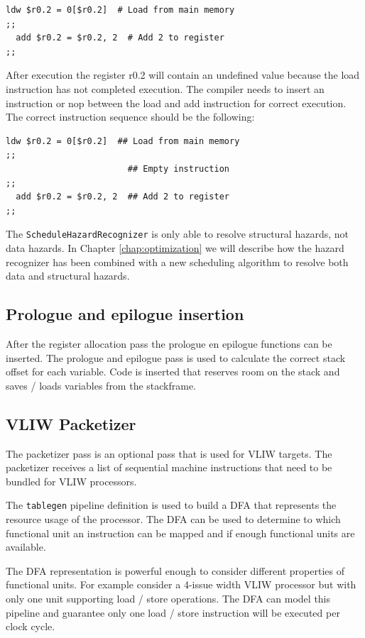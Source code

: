 \begin{lstlisting}[language=rvex]
  ldw $r0.2 = 0[$r0.2]  # Load from main memory
;;
  add $r0.2 = $r0.2, 2  # Add 2 to register
;;
\end{lstlisting}

After execution the register r0.2 will contain an undefined value because the load instruction has not completed execution. The compiler needs to insert an instruction or nop between the load and add instruction for correct execution. The correct instruction sequence should be the following:

\begin{lstlisting}[language=rvex]
  ldw $r0.2 = 0[$r0.2]  ## Load from main memory
;;
                        ## Empty instruction
;;
  add $r0.2 = $r0.2, 2  ## Add 2 to register
;;
\end{lstlisting}

The \texttt{ScheduleHazardRecognizer} is only able to resolve structural hazards, not data hazards. In Chapter \ref{chap:optimization} we will describe how the hazard recognizer has been combined with a new scheduling algorithm to resolve both data and structural hazards.

\subsection{Prologue and epilogue insertion}
After the register allocation pass the prologue en epilogue functions can be inserted. The prologue and epilogue pass is used to calculate the correct stack offset for each variable. Code is inserted that reserves room on the stack and saves / loads variables from the stackframe.

\subsection{VLIW Packetizer}
The packetizer pass is an optional pass that is used for VLIW targets. The packetizer receives a list of sequential machine instructions that need to be bundled for VLIW processors. 

The \texttt{tablegen} pipeline definition is used to build a DFA that represents the resource usage of the processor. The DFA can be used to determine to which functional unit an instruction can be mapped and if enough functional units are available.

The DFA representation is powerful enough to consider different properties of functional units. For example consider a 4-issue width VLIW processor but with only one unit supporting load / store operations. The DFA can model this pipeline and guarantee only one load / store instruction will be executed per clock cycle.

